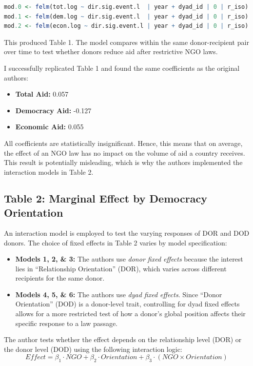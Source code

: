 \documentclass[12pt, a4paper]{article}
\begin{document}
\begin{lstlisting}[language=R]
mod.0 <- felm(tot.log ~ dir.sig.event.l  | year + dyad_id | 0 | r_iso)
mod.1 <- felm(dem.log ~ dir.sig.event.l  | year + dyad_id | 0 | r_iso)
mod.2 <- felm(econ.log ~ dir.sig.event.l | year + dyad_id | 0 | r_iso)
\end{lstlisting}

This produced Table 1. The model compares within the same donor-recipient pair over time to test whether donors reduce aid after restrictive NGO laws. 

I successfully replicated Table 1 and found the same coefficients as the original authors:
\begin{itemize}
    \item \textbf{Total Aid:} 0.057
    \item \textbf{Democracy Aid:} -0.127
    \item \textbf{Economic Aid:} 0.055
\end{itemize}

All coefficients are statistically insignificant. Hence, this means that on average, the effect of an NGO law has no impact on the volume of aid a country receives. This result is potentially misleading, which is why the authors implemented the interaction models in Table 2.
\subsection{Table 2: Marginal Effect by Democracy Orientation}

An interaction model is employed to test the varying responses of DOR and DOD donors. The choice of fixed effects in Table 2 varies by model specification:
\begin{itemize}
    \item \textbf{Models 1, 2, \& 3:} The authors use \textit{donor fixed effects} because the interest lies in ``Relationship Orientation'' (DOR), which varies across different recipients for the same donor.
    \item \textbf{Models 4, 5, \& 6:} The authors use \textit{dyad fixed effects}. Since ``Donor Orientation'' (DOD) is a donor-level trait, controlling for dyad fixed effects allows for a more restricted test of how a donor's global position affects their specific response to a law passage.
\end{itemize}

The author tests whether the effect depends on the relationship level (DOR) or the donor level (DOD) using the following interaction logic:
\begin{equation}
    Effect = \beta_1 \cdot NGO + \beta_2 \cdot Orientation + \beta_3 \cdot (NGO \times Orientation)
\end{equation}
\end{document}
